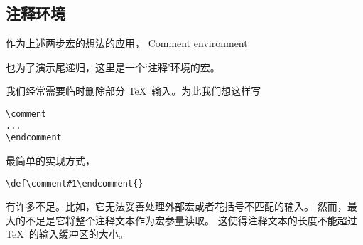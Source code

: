 \documentclass[letterpaper]{book}
\begin{document}
\subsection{注释环境}

作为上述两步宏的想法的应用，
\howto Comment environment\par
也为了演示尾递归，这里是一个`注释'环境的宏。

我们经常需要临时删除部分 \TeX\ 输入。为此我们想这样写
\begin{verbatim}
\comment
...
\endcomment
\end{verbatim}
最简单的实现方式，
\begin{verbatim}
\def\comment#1\endcomment{}
\end{verbatim} 
有许多不足。比如，它无法妥善处理外部宏或者花括号不匹配的输入。
然而，最大的不足是它将整个注释文本作为宏参量读取。
这使得注释文本的长度不能超过 \TeX\ 的输入缓冲区的大小。
\end{document}
